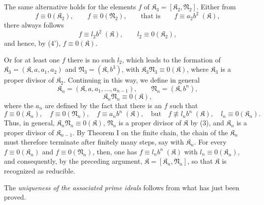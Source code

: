 \documentclass[11pt]{article}
\newcommand{\ideal}[1]{\mathfrak{#1}}
\begin{document}
The same alternative holds for the elements $f$ of $\ideal K_3=[\ideal K_2,\ideal N_2]$. Either from
\[
 f\equiv0(\ideal K_2),
 \qquad f\equiv0(\ideal N_2),
 \qquad\text{that is}\qquad f\equiv a_2b^2\;(\ideal K),
\]
there always follows
\[
 f\equiv l_2b^2\;(\ideal K),
 \qquad l_2\equiv0(\ideal K_2),
\]
and hence, by (4'), $f\equiv0(\ideal K)$.

Or for at least one $f$ there is no such $l_2$, which leads to the formation of $\ideal K_3=(\ideal K,a,a_1,a_2)$ and $\ideal N_3=(\ideal K,b^3)$, with $\ideal K_3\ideal N_3\equiv0(\ideal K)$, where $\ideal K_3$ is a proper divisor of $\ideal K_2$. Continuing in this way, we define in general
\[
 \ideal K_n=(\ideal K,a,a_1,\ldots,a_{n-1}),
 \qquad
 \ideal N_n=(\ideal K,b^n),
\]
\[
 \ideal K_n\ideal N_n\equiv0(\ideal K),
\]
where the $a_n$ are defined by the fact that there is an $f$ such that
\[
 f\equiv0(\ideal K_n),\quad f\equiv0(\ideal N_n),\quad
 f\equiv a_n b^n\;(\ideal K),\quad\text{but}\quad
 f\not\equiv l_n b^n\;(\ideal K),\quad l_n\equiv0(\ideal K_n).
\]
Thus, in general, $\ideal K_n\ideal N_n\equiv0(\ideal K)$, $\ideal N_n$ is a proper divisor of $\ideal K$ by (3), and $\ideal K_n$ is a proper divisor of $\ideal K_{n-1}$. By Theorem I on the finite chain, the chain of the $\ideal K_n$ must therefore terminate after finitely many steps, say with $\ideal K_n$. For every $f\equiv0(\ideal K_n)$ and $f\equiv0(\ideal N_n)$, then, one has $f\equiv l_n b^n\;(\ideal K)$ with $l_n\equiv0(\ideal K_n)$, and consequently, by the preceding argument, $\ideal K=[\ideal K_n,\ideal N_n]$, so that $\ideal K$ is recognized as reducible.

The \emph{uniqueness of the associated prime ideals} follows from what has just been proved.
\end{document}
